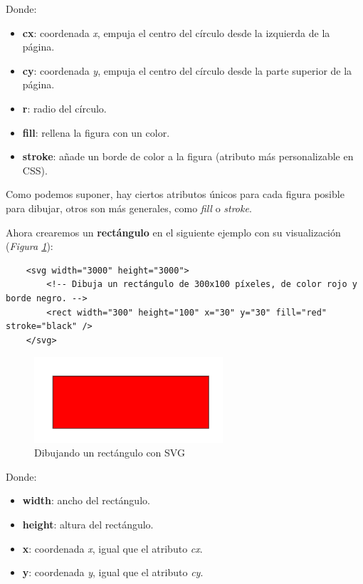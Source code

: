 Donde:
\begin{itemize}
    \item \textbf{cx}: coordenada \textit{x}, empuja el centro del círculo desde la izquierda de la página.
    \item \textbf{cy}: coordenada \textit{y}, empuja el centro del círculo desde la parte superior de la página.
    \item \textbf{r}: radio del círculo.
    \item \textbf{fill}: rellena la figura con un color.
    \item \textbf{stroke}: añade un borde de color a la figura (atributo más personalizable en CSS).
\end{itemize}

Como podemos suponer, hay ciertos atributos únicos para cada figura posible para dibujar, otros son más generales, como \textit{fill} o \textit{stroke}.

Ahora crearemos un \textbf{rectángulo} en el siguiente ejemplo con su visualización (\textit{Figura \ref{fig: 21}}):
\begin{lstlisting}
    <svg width="3000" height="3000">
        <!-- Dibuja un rectángulo de 300x100 píxeles, de color rojo y borde negro. -->
        <rect width="300" height="100" x="30" y="30" fill="red" stroke="black" />
    </svg>
\end{lstlisting}
\begin{figure}[H]
    \centering
    \caption{Dibujando un rectángulo con SVG}
    \label{fig: 21}
    \includegraphics[width=7cm]{ss_html/svg_rect.png}
\end{figure}

Donde:
\begin{itemize}
    \item \textbf{width}: ancho del rectángulo.
    \item \textbf{height}: altura del rectángulo.
    \item \textbf{x}: coordenada \textit{x}, igual que el atributo \textit{cx}.
    \item \textbf{y}: coordenada \textit{y}, igual que el atributo \textit{cy}.
\end{itemize}

